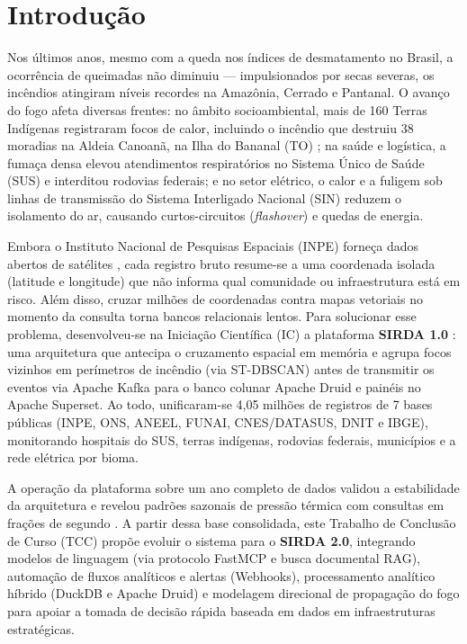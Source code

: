 \section{Introdução}
\label{sc:introducao}

Nos últimos anos, mesmo com a queda nos índices de desmatamento no Brasil, a ocorrência de queimadas não diminuiu — impulsionados por secas severas, os incêndios atingiram níveis recordes na Amazônia, Cerrado e Pantanal. O avanço do fogo afeta diversas frentes: no âmbito socioambiental, mais de 160 Terras Indígenas registraram focos de calor, incluindo o incêndio que destruiu 38 moradias na Aldeia Canoanã, na Ilha do Bananal (TO) \cite{g1_canoana_2026}; na saúde e logística, a fumaça densa elevou atendimentos respiratórios no Sistema Único de Saúde (SUS) e interditou rodovias federais; e no setor elétrico, o calor e a fuligem sob linhas de transmissão do Sistema Interligado Nacional (SIN) reduzem o isolamento do ar, causando curtos-circuitos (\textit{flashover}) e quedas de energia.

Embora o Instituto Nacional de Pesquisas Espaciais (INPE) forneça dados abertos de satélites \cite{inpe2025bdqueimadas}, cada registro bruto resume-se a uma coordenada isolada (latitude e longitude) que não informa qual comunidade ou infraestrutura está em risco. Além disso, cruzar milhões de coordenadas contra mapas vetoriais no momento da consulta torna bancos relacionais lentos. Para solucionar esse problema, desenvolveu-se na Iniciação Científica (IC) a plataforma \textbf{SIRDA 1.0} \cite{sampaio2026ic}: uma arquitetura que antecipa o cruzamento espacial em memória e agrupa focos vizinhos em perímetros de incêndio (via ST-DBSCAN) antes de transmitir os eventos via Apache Kafka para o banco colunar Apache Druid \cite{yang2014druid} e painéis no Apache Superset. Ao todo, unificaram-se 4,05 milhões de registros de 7 bases públicas (INPE, ONS, ANEEL, FUNAI, CNES/DATASUS, DNIT e IBGE), monitorando hospitais do SUS, terras indígenas, rodovias federais, municípios e a rede elétrica por bioma.

A operação da plataforma sobre um ano completo de dados validou a estabilidade da arquitetura e revelou padrões sazonais de pressão térmica com consultas em frações de segundo \cite{sampaio2026ic}. A partir dessa base consolidada, este Trabalho de Conclusão de Curso (TCC) propõe evoluir o sistema para o \textbf{SIRDA 2.0}, integrando modelos de linguagem (via protocolo FastMCP e busca documental RAG), automação de fluxos analíticos e alertas (Webhooks), processamento analítico híbrido (DuckDB \cite{raasveldt2019duckdb} e Apache Druid) e modelagem direcional de propagação do fogo para apoiar a tomada de decisão rápida baseada em dados em infraestruturas estratégicas.

